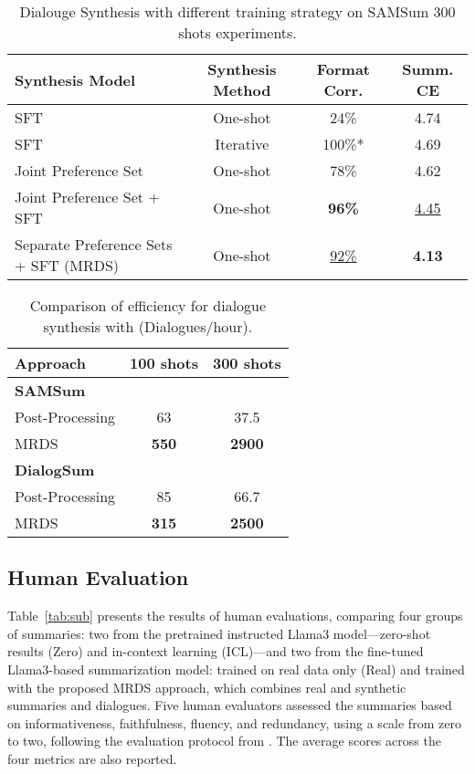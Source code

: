 \begin{table*}[htp]
\centering
\begin{tabular}{lccc}
\toprule
 \textbf{Synthesis Model} & \textbf{Synthesis Method} & \textbf{Format Corr.} & \textbf{Summ. CE} \\
\midrule
SFT  &  One-shot & 24\% & 4.74 \\
SFT & Iterative  & 100\%* & 4.69 \\
\midrule
Joint Preference Set  & One-shot &  78\% & 4.62 \\
Joint Preference Set + SFT  & One-shot &  \textbf{96\%} & \underline{4.45} \\
Separate Preference Sets + SFT (MRDS) & One-shot &  \underline{92\%} & \textbf{4.13} \\
\bottomrule
\end{tabular}
\caption{Dialouge Synthesis with different training strategy on SAMSum 300 shots experiments.}
\label{tab:DPO abl}
\end{table*}

\begin{table}[htp]
\centering
\caption{Comparison of efficiency for dialogue synthesis with (Dialogues/hour).}
\label{tab:eff}
\begin{tabular}{lcc}
\toprule
{Approach} & {100 shots} & {300 shots}  \\
\midrule
\multicolumn{3}{l}{\textbf{SAMSum}} \\
\midrule
Post-Processing & 63 & 37.5  \\
MRDS & \textbf{550} & \textbf{2900}  \\
\midrule
\multicolumn{3}{l}{\textbf{DialogSum}} \\
\midrule 
Post-Processing & 85 & 66.7  \\
MRDS & \textbf{315} & \textbf{2500} \\
\bottomrule
\end{tabular}
\end{table}



\subsection{Human Evaluation}
\label{sec:he}

Table~\ref{tab:sub} presents the results of human evaluations, comparing four groups of summaries: two from the pretrained instructed Llama3 model—zero-shot results (Zero) and in-context learning (ICL)—and two from the fine-tuned Llama3-based summarization model: trained on real data only (Real) and trained with the proposed MRDS approach, which combines real and synthetic summaries and dialogues. Five human evaluators assessed the summaries based on informativeness, faithfulness, fluency, and redundancy, using a scale from zero to two, following the evaluation protocol from \citep{xie-etal-2024-shot}. The average scores across the four metrics are also reported.

